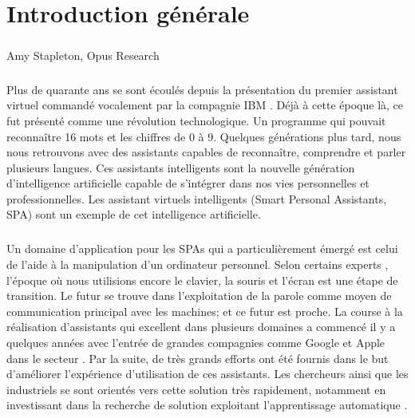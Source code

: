 \chapter*{Introduction générale}
\paragraph{}
\begin{chapquote}{Amy Stapleton, Opus Research}
\end{chapquote}

\paragraph{}
Plus de quarante ans se sont écoulés depuis la présentation du premier assistant virtuel commandé vocalement par la compagnie IBM \citep{ibm_spa}. Déjà à cette époque là, ce fut présenté comme une révolution technologique. Un programme qui pouvait reconnaître 16 mots et les chiffres de 0 à 9. Quelques générations plus tard, nous nous retrouvons avec des assistants capables de reconnaître, comprendre et parler plusieurs langues. Ces assistants intelligents sont la nouvelle génération d'intelligence artificielle capable de s'intégrer dans nos vies personnelles et professionnelles. Les assistant virtuels intelligents (Smart Personal Assistants, SPA) sont un exemple de cet intelligence artificielle. 

\paragraph{}
Un domaine d'application pour les SPAs qui a particulièrement émergé est celui de l'aide à la manipulation d'un ordinateur personnel. Selon certains experts \citep{spa_arch,virtualbutler,SPA-overview}, l'époque où nous utilisions encore le clavier, la souris et l'écran est une étape de transition. Le futur se trouve dans l'exploitation de la parole comme moyen de communication principal avec les machines; et ce futur est proche. La course à la réalisation d'assistants qui excellent dans plusieurs domaines a commencé il y a quelques années avec l'entrée de grandes compagnies comme Google et Apple dans le secteur \citep{spas_survey}. Par la suite, de très grands efforts ont été fournis dans le but d'améliorer l'expérience d'utilisation de ces assistants. Les chercheurs ainsi que les industriels se sont orientés vers cette solution très rapidement, notamment en investissant dans la recherche de solution exploitant l'apprentissage automatique \citep{spas_survey}.

